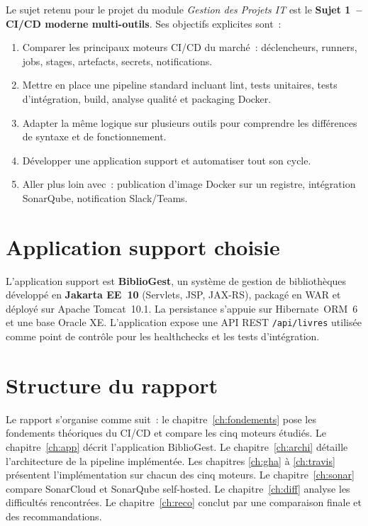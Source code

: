 \documentclass[12pt,a4paper]{report}
\begin{document}
Le sujet retenu pour le projet du module \emph{Gestion des Projets IT} est le
\textbf{Sujet 1~-- CI/CD moderne multi-outils}. Ses objectifs explicites sont~:

\begin{enumerate}[leftmargin=*, label=\arabic*.]
  \item Comparer les principaux moteurs CI/CD du marché~: déclencheurs,
        runners, jobs, stages, artefacts, secrets, notifications.
  \item Mettre en place une pipeline standard incluant lint, tests unitaires,
        tests d'intégration, build, analyse qualité et packaging Docker.
  \item Adapter la même logique sur plusieurs outils pour comprendre les
        différences de syntaxe et de fonctionnement.
  \item Développer une application support et automatiser tout son cycle.
  \item Aller plus loin avec~: publication d'image Docker sur un registre,
        intégration SonarQube, notification Slack/Teams.
\end{enumerate}

\section{Application support choisie}

L'application support est \textbf{BiblioGest}, un système de gestion de
bibliothèques développé en \textbf{Jakarta EE~10} (Servlets, JSP, JAX-RS),
packagé en WAR et déployé sur Apache Tomcat~10.1. La persistance s'appuie sur
Hibernate~ORM~6 et une base Oracle XE. L'application expose une API REST
\texttt{/api/livres} utilisée comme point de contrôle pour les healthchecks et
les tests d'intégration.

\section{Structure du rapport}

Le rapport s'organise comme suit~: le chapitre~\ref{ch:fondements} pose les
fondements théoriques du CI/CD et compare les cinq moteurs étudiés. Le
chapitre~\ref{ch:app} décrit l'application BiblioGest. Le chapitre~\ref{ch:archi}
détaille l'architecture de la pipeline implémentée. Les chapitres
\ref{ch:gha} à \ref{ch:travis} présentent l'implémentation sur chacun des cinq
moteurs. Le chapitre~\ref{ch:sonar} compare SonarCloud et SonarQube
self-hosted. Le chapitre~\ref{ch:diff} analyse les difficultés rencontrées.
Le chapitre~\ref{ch:reco} conclut par une comparaison finale et des
recommandations.
\end{document}
